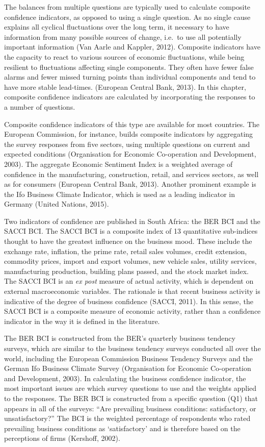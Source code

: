 \documentclass[11pt,]{article}
\begin{document}
The balances from multiple questions are typically used to calculate
composite confidence indicators, as opposed to using a single question.
As no single cause explains all cyclical fluctuations over the long
term, it necessary to have information from many possible sources of
change, i.e.~to use all potentially important information (Van Aarle and
Kappler, 2012). Composite indicators have the capacity to react to
various sources of economic fluctuations, while being resilient to
fluctuations affecting single components. They often have fewer false
alarms and fewer missed turning points than individual components and
tend to have more stable lead-times. (European Central Bank, 2013). In
this chapter, composite confidence indicators are calculated by
incorporating the responses to a number of questions.

Composite confidence indicators of this type are available for most
countries. The European Commission, for instance, builds composite
indicators by aggregating the survey responses from five sectors, using
multiple questions on current and expected conditions (Organisation for
Economic Co-operation and Development, 2003). The aggregate Economic
Sentiment Index is a weighted average of confidence in the
manufacturing, construction, retail, and services sectors, as well as
for consumers (European Central Bank, 2013). Another prominent example
is the Ifo Business Climate Indicator, which is used as a leading
indicator in Germany (United Nations, 2015).

Two indicators of confidence are published in South Africa: the BER BCI
and the SACCI BCI. The SACCI BCI is a composite index of 13 quantitative
sub-indices thought to have the greatest influence on the business mood.
These include the exchange rate, inflation, the prime rate, retail sales
volumes, credit extension, commodity prices, import and export volumes,
new vehicle sales, utility services, manufacturing production, building
plans passed, and the stock market index. The SACCI BCI is an \emph{ex
post} measure of actual activity, which is dependent on external
macroeconomic variables. The rationale is that recent business activity
is indicative of the degree of business confidence (SACCI, 2011). In
this sense, the SACCI BCI is a composite measure of economic activity,
rather than a confidence indicator in the way it is defined in the
literature.

The BER BCI is constructed from the BER's quarterly business tendency
surveys, which are similar to the business tendency surveys conducted
all over the world, including the European Commission Business Tendency
Surveys and the German Ifo Business Climate Survey (Organisation for
Economic Co-operation and Development, 2003). In calculating the
business confidence indicator, the most important issues are which
survey questions to use and the weights applied to the responses. The
BER BCI is constructed from a specific question (Q1) that appears in all
of the surveys: ``Are prevailing business conditions: satisfactory, or
unsatisfactory?'' The BCI is the weighted percentage of respondents who
rated prevailing business conditions as `satisfactory' and is therefore
based on the perceptions of firms (Kershoff, 2002).
\end{document}
